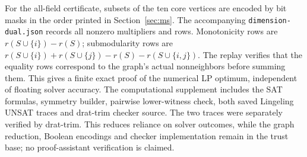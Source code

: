 For the all-field certificate, subsets of the ten core vertices are
encoded by bit masks in the order printed in Section~\ref{sec:ms}.
The accompanying \texttt{dimension-dual.json} records all nonzero
multipliers and rows. Monotonicity rows are
$r(S\cup\{i\})-r(S)$; submodularity rows are
$r(S\cup\{i\})+r(S\cup\{j\})-r(S)-r(S\cup\{i,j\})$.
The replay verifies that the equality rows correspond to the graph's
actual nonneighbors before summing them. This gives a finite exact
proof of the numerical LP optimum, independent of floating solver
accuracy. The computational supplement includes the SAT formulas,
symmetry builder, pairwise lower-witness check, both saved Lingeling
UNSAT traces and drat-trim checker source. The two traces were separately
verified by drat-trim. This reduces reliance on solver outcomes, while
the graph reduction, Boolean encodings and checker implementation remain
in the trust base; no proof-assistant verification is claimed.
